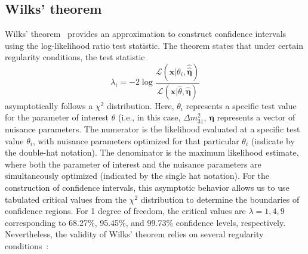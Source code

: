 \clearpage
\subsection{Wilks' theorem}
Wilks' theorem~\cite{Wilks:1938dza} provides an approximation to construct confidence intervals using the log-likelihood ratio test statistic. The theorem states that under certain regularity conditions, the test statistic 
\begin{equation}\label{eq:lambda_i}
\lambda_i = -2\log\frac{\mathcal{L}(\bm{x}|\theta_i, \hat{\hat{\bm \eta}})}{\mathcal{L}(\bm{x}|\hat{\theta}, \hat{\bm \eta})}
\end{equation}
asymptotically follows a $\chi^2$ distribution. Here, $\theta_i$ represents a specific test value for the parameter of interest $\theta$ (i.e., in this case, $\Delta m^2_{31}$, $\bm \eta$ represents a vector of nuisance parameters. 
The numerator is the likelihood evaluated at a specific test value $\theta_i$, with nuisance parameters optimized for that particular $\theta_i$ (indicate by the double-hat notation). The denominator is the maximum likelihood estimate, where both the parameter of interest and the nuisance parameters are simultaneously optimized (indicated by the single hat notation). For the construction of confidence intervals, this asymptotic behavior allows us to use tabulated critical values from the $\chi^2$ distribution to determine the boundaries of confidence regions. For 1 degree of freedom, the critical values are $\lambda = 1, 4, 9$ corresponding to 68.27\%, 95.45\%, and 99.73\% confidence levels, respectively.
Nevertheless, the validity of Wilks' theorem relies on several regularity conditions~\cite{Wilks:1938dza, Fan:2000gm, Cranmer:2005hi, Cowan:2010js, ParticleDataGroup:2024cfk}:

